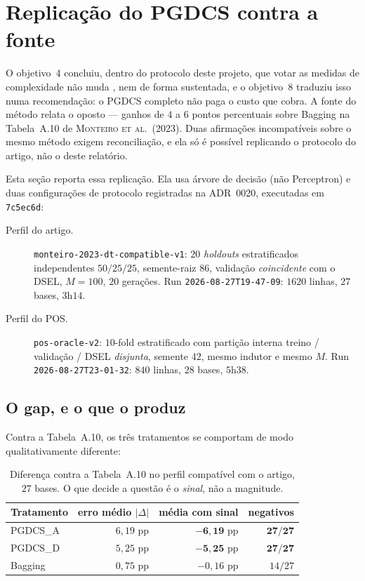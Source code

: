 \section{Replicação do PGDCS contra a fonte}

O objetivo~4 concluiu, dentro do protocolo deste projeto, que votar as medidas de
complexidade não muda , \mvr{} nem \dfe{} de forma sustentada, e o objetivo~8
traduziu isso numa recomendação: o PGDCS completo não paga o custo que cobra. A fonte do método relata o oposto --- ganhos de $4$ a $6$ pontos percentuais
sobre Bagging na Tabela~A.10 de \textsc{Monteiro et al.}~(2023). Duas afirmações
incompatíveis sobre o mesmo método exigem reconciliação, e ela só é possível
replicando o protocolo do artigo, não o deste relatório.

Esta seção reporta essa replicação. Ela usa árvore de decisão (não Perceptron) e
duas configurações de protocolo registradas na ADR~0020, executadas em
\texttt{7c5ec6d}:

\begin{description}
\item[Perfil do artigo.] \texttt{monteiro-2023-\hspace{0pt}dt-\hspace{0pt}compatible-v1}: $20$
\emph{holdouts} estratificados independentes $50/25/25$, semente-raiz $86$,
validação \emph{coincidente} com o DSEL, $M=100$, $20$ gerações. Run
\texttt{2026-08-27\hspace{0pt}T19\hspace{0pt}-47-09}: $1620$ linhas, $27$ bases, $3$h$14$.
\item[Perfil do POS.] \texttt{pos-oracle-v2}: $10$-fold estratificado com
partição interna treino / validação / DSEL \emph{disjunta}, semente $42$, mesmo
indutor e mesmo $M$. Run \texttt{2026-08-27\hspace{0pt}T23\hspace{0pt}-01-32}: $840$ linhas, $28$ bases,
$5$h$38$.
\end{description}

\subsection{O gap, e o que o produz}

Contra a Tabela~A.10, os três tratamentos se comportam de modo qualitativamente
diferente:

\begin{table}[htbp]
\centering\small
\caption{Diferença contra a Tabela~A.10 no perfil compatível com o artigo, $27$
bases. O que decide a questão é o \emph{sinal}, não a magnitude.}
\begin{tabular}{lrrr}
\toprule
Tratamento & erro médio $|\Delta|$ & média com sinal & negativos \\
\midrule
PGDCS\_A & $6{,}19$ pp & $\mathbf{-6{,}19}$ pp & $\mathbf{27/27}$ \\
PGDCS\_D & $5{,}25$ pp & $\mathbf{-5{,}25}$ pp & $\mathbf{27/27}$ \\
Bagging  & $0{,}75$ pp & $-0{,}16$ pp & $14/27$ \\
\bottomrule
\end{tabular}
\end{table}

